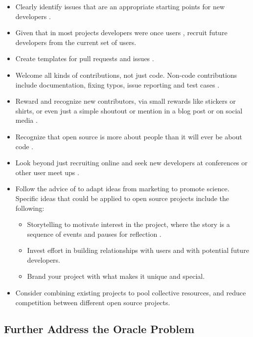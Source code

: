\documentclass[final, 3p, times, authoryear]{elsarticle}
\begin{document}
\begin{itemize}
	\item Clearly identify issues that are an appropriate starting points for
	new developers \citep{Garcia2016, Jalan2016, Proffitt2017}.
	\item Given that in most projects developers were once users
	\citep{McQuaid2018}, recruit future developers from the current set of
	users.
	\item Create templates for pull requests and issues \citep{Jalan2016}.
    \item Welcome all kinds of contributions, not just code.  Non-code
    contributions include documentation, fixing typos, issue reporting and test
    cases \citep{Jalan2016, Proffitt2017}.
    \item Reward and recognize new contributors, via small rewards like stickers
    or shirts, or even just a simple shoutout or mention in a blog post or on
    social media \citep{Jalan2016, Proffitt2017}.
    \item Recognize that open source is more about people than it will ever be
    about code \citep{Jalan2016}.
    \item Look beyond just recruiting online and seek new developers at
    conferences or other user meet ups \citep{Garcia2016}.
    \item Follow the advice of \citet{Kuchner2012} to adapt ideas from marketing
    to promote science.  Specific ideas that could be applied to open source
    projects include the following: 
    \begin{itemize}
		\item Storytelling to motivate interest in the project, where the story
		is a sequence of events and pauses for reflection \citep[p.\
		21--22]{Kuchner2012}.
		\item Invest effort in building relationships with users and with potential future developers.
		\item Brand your project with what makes it unique and special.
	\end{itemize}
	\item Consider combining existing projects to pool collective resources, and
	reduce competition between different open source projects.
\end{itemize}

\subsection{Further Address the Oracle Problem} \label{Sec_FurtherOracle}
\end{document}
